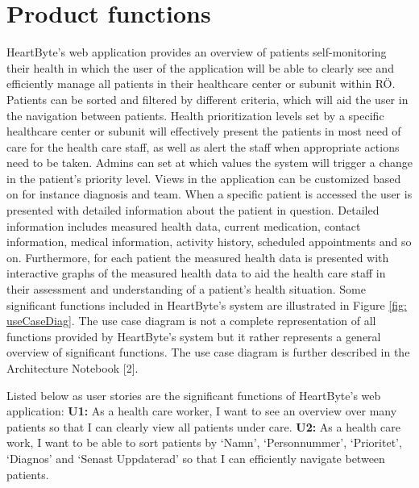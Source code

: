 \documentclass{scrreprt}
\begin{document}
\section{Product functions} 
HeartByte’s web application provides an overview of patients self-monitoring their health in which the user of the application will be able to clearly see and efficiently manage all patients in their healthcare center or subunit within RÖ. Patients can be sorted and filtered by different criteria, which will aid the user in the navigation between patients. Health prioritization levels set by a specific healthcare center or subunit will effectively present the patients in most need of care for the health care staff, as well as alert the staff when appropriate actions need to be taken. Admins can set at which values the system will trigger a change in the patient’s priority level. Views in the application can be customized based on for instance diagnosis and team. When a specific patient is accessed the user is presented with detailed information about the patient in question. Detailed information includes measured health data, current medication, contact information, medical information, activity history, scheduled appointments and so on. Furthermore, for each patient the measured health data is presented with interactive graphs of the measured health data to aid the health care staff in their assessment and understanding of a patient’s health situation. 
\newline
\newline
Some significant functions included in HeartByte’s system are illustrated in Figure \ref{fig: useCaseDiag}. The use case diagram is not a complete representation of all functions provided by HeartByte’s system but it rather represents a general overview of significant functions. The use case diagram is further described in the Architecture Notebook [2].

Listed below as user stories are the significant functions of HeartByte’s web application:
\newline
\newline
\textbf{U1:} As a health care worker, I want to see an overview over many patients so that I can clearly view all patients under care.
\newline
\newline
\textbf{U2:} As a health care work, I want to be able to sort patients by ‘Namn’, ‘Personnummer’, ‘Prioritet’, ‘Diagnos’ and ‘Senast Uppdaterad’ so that I can efficiently navigate between patients.
\end{document}
